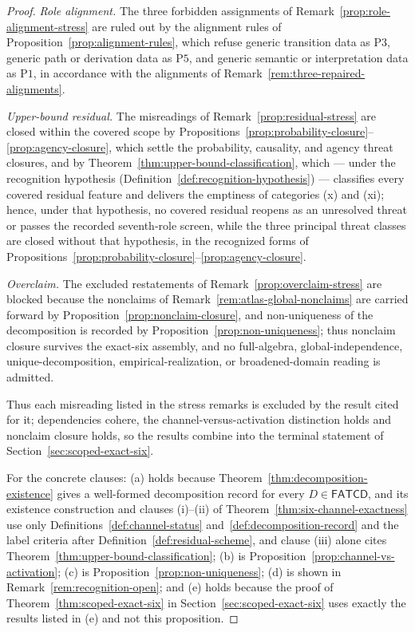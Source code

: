 \documentclass[11pt]{article}
\theoremstyle{definition}
\newcommand{\FATCD}{\ensuremath{\mathsf{FATCD}}}
\newcommand{\Pone}{\ensuremath{\mathrm{P1}}}
\newcommand{\Pthree}{\ensuremath{\mathrm{P3}}}
\newcommand{\Pfive}{\ensuremath{\mathrm{P5}}}
\begin{document}
\begin{proof}
\emph{Role alignment.} The three forbidden assignments of
Remark~\ref{prop:role-alignment-stress} are ruled out by the alignment
rules of Proposition~\ref{prop:alignment-rules}, which refuse generic
transition data as \Pthree{}, generic path or derivation data as
\Pfive{}, and generic semantic or interpretation data as \Pone{}, in
accordance with the alignments of
Remark~\ref{rem:three-repaired-alignments}.

\emph{Upper-bound residual.} The misreadings of
Remark~\ref{prop:residual-stress} are closed within the covered scope by
Propositions~\ref{prop:probability-closure}--\ref{prop:agency-closure},
which settle the probability, causality, and agency threat closures, and
by Theorem~\ref{thm:upper-bound-classification}, which --- under the
recognition hypothesis (Definition~\ref{def:recognition-hypothesis}) ---
classifies every covered residual feature and delivers the emptiness of
categories (x) and (xi); hence, under that hypothesis, no covered residual
reopens as an unresolved threat or passes the recorded seventh-role screen, while the
three principal threat classes are closed without that hypothesis, in the
recognized forms of
Propositions~\ref{prop:probability-closure}--\ref{prop:agency-closure}.

\emph{Overclaim.} The excluded restatements of
Remark~\ref{prop:overclaim-stress} are blocked because the nonclaims of
Remark~\ref{rem:atlas-global-nonclaims} are carried forward by
Proposition~\ref{prop:nonclaim-closure}, and non-uniqueness of the
decomposition is recorded by Proposition~\ref{prop:non-uniqueness}; thus
nonclaim closure survives the exact-six assembly, and no full-algebra,
global-independence, unique-decomposition, empirical-realization, or
broadened-domain reading is admitted.

Thus each misreading listed in the stress remarks is excluded by the result
cited for it; dependencies cohere, the channel-versus-activation distinction
holds and nonclaim closure holds, so the results combine into the terminal
statement of
Section~\ref{sec:scoped-exact-six}.

For the concrete clauses: (a) holds because Theorem~\ref{thm:decomposition-existence}
gives a well-formed decomposition record for every \(D\in\FATCD{}\), and its
existence construction and clauses (i)--(ii) of
Theorem~\ref{thm:six-channel-exactness} use only
Definitions~\ref{def:channel-status} and~\ref{def:decomposition-record} and the
label criteria after Definition~\ref{def:residual-scheme}, and clause (iii)
alone cites Theorem~\ref{thm:upper-bound-classification}; (b) is
Proposition~\ref{prop:channel-vs-activation}; (c) is
Proposition~\ref{prop:non-uniqueness}; (d) is shown in
Remark~\ref{rem:recognition-open}; and (e) holds because the proof of
Theorem~\ref{thm:scoped-exact-six} in Section~\ref{sec:scoped-exact-six} uses exactly
the results listed in (e) and not this proposition.
\end{proof}
\end{document}
